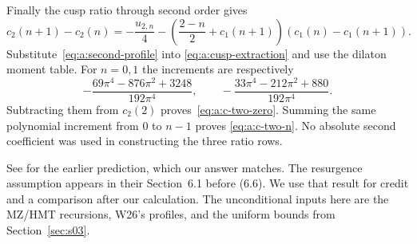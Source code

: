 \begin{prf}
Finally the cusp ratio through second order gives
\[
 c_2(n+1)-c_2(n)=-\frac{u_{2,n}}4
 -\left(\frac{2-n}{2}+c_1(n+1)\right)
                         (c_1(n)-c_1(n+1)).
\]
Substitute~\eqref{eq:a:second-profile} into
\eqref{eq:a:cusp-extraction} and use the dilaton moment table.
For $n=0,1$ the increments are respectively
\[
 -\frac{69\pi^4-876\pi^2+3248}{192\pi^4},\qquad
 -\frac{33\pi^4-212\pi^2+880}{192\pi^4}.
\]
Subtracting them from $c_2(2)$ proves~\eqref{eq:a:c-two-zero}.
Summing the same polynomial increment from $0$ to $n-1$ proves
\eqref{eq:a:c-two-n}. No absolute second coefficient was used in
constructing the three ratio rows.
\end{prf}

\begin{rmk}[Prediction]
See \cite[(6.10)]{EGGLS24} for the earlier prediction, which our answer
matches.
The resurgence assumption appears in their Section~6.1 before (6.6).
We use that result for credit and a comparison after our calculation.
The unconditional inputs here
are the MZ/HMT recursions, W26's profiles, and the uniform bounds from
Section~\ref{sec:s03}.
\end{rmk}
